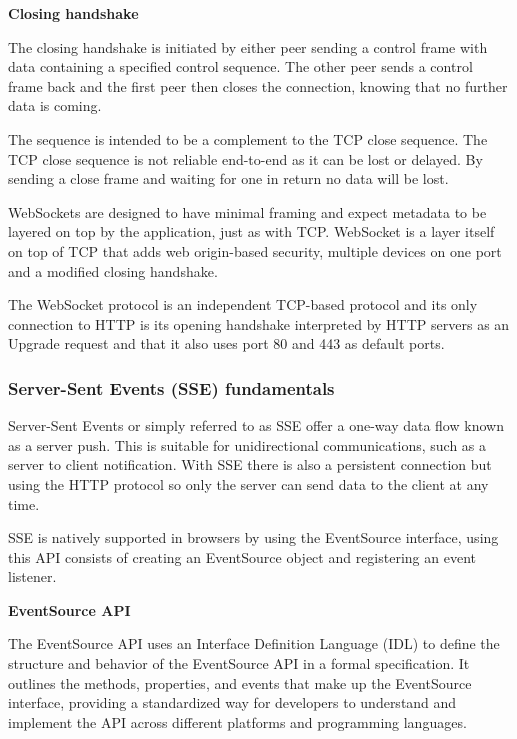 \textbf{Closing handshake}

The closing handshake is initiated by either peer sending a control frame with data containing a specified control sequence. The other peer sends a control frame back and the first peer then closes the connection, knowing that no further data is coming.

The sequence is intended to be a complement to the TCP close sequence. The TCP close sequence is not reliable end-to-end as it can be lost or delayed. By sending a close frame and waiting for one in return no data will be lost.

WebSockets are designed to have minimal framing and expect metadata to be layered on top by the application, just as with TCP. WebSocket is a layer itself on top of TCP that adds web origin-based security, multiple devices on one port and a modified closing handshake.

The WebSocket protocol is an independent TCP-based protocol and its only connection to HTTP is its opening handshake interpreted by HTTP servers as an Upgrade request and that it also uses port 80 and 443 as default ports. \cite{ws-rfc}

\subsubsection{Server-Sent Events (SSE) fundamentals}

Server-Sent Events or simply referred to as SSE offer a one-way data flow known as a server push. This is suitable for unidirectional communications, such as a server to client notification. With SSE there is also a persistent connection but using the HTTP protocol so only the server can send data to the client at any time.

SSE is natively supported in browsers by using the EventSource interface, using this API consists of creating an EventSource object and registering an event listener. \cite{html-spec-sse}

\textbf{EventSource API}

The EventSource API uses an Interface Definition Language (IDL) to define the structure and behavior of the EventSource API in a formal specification. It outlines the methods, properties, and events that make up the EventSource interface, providing a standardized way for developers to understand and implement the API across different platforms and programming languages. \cite{html-spec-sse}

